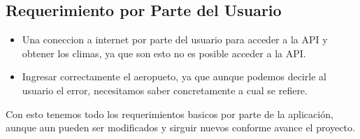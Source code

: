 \subsection{Requerimiento por Parte del Usuario}
\begin{itemize}
    \item Una coneccion a internet por parte del usuario para acceder a la API y obtener los climas, ya que son esto no es posible acceder a la API.
    \item Ingresar correctamente el aeropueto, ya que aunque podemos decirle al usuario el error, necesitamos saber concretamente a cual se refiere.
\end{itemize}

Con esto tenemos todo los requerimientos basicos por parte de la aplicación, aunque aun pueden ser modificados y sirguir nuevos conforme avance
el proyecto.